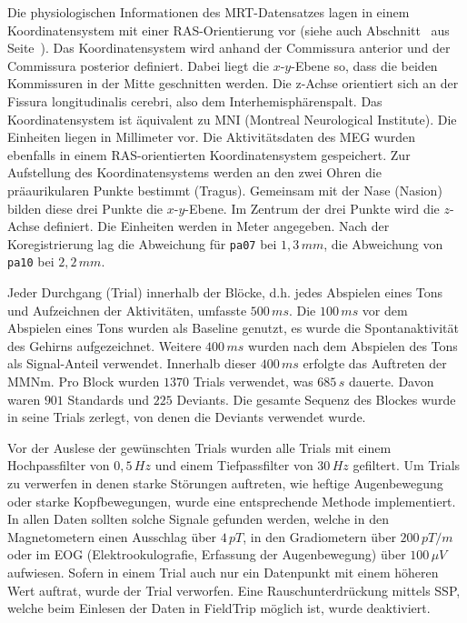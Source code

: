 \documentclass[doc,a4paper,12pt]{apa6}
\makeatletter
\DeclareRobustCommand*{\nameref}[1]{%
      \glqq{\myorg@nameref{#1}}\grqq%
    }%
\makeatother
\begin{document}
Die physiologischen Informationen des MRT-Datensatzes lagen in einem Koordinatensystem mit einer RAS-Orientierung vor (siehe auch Abschnitt~\nameref{sec:coreg} aus Seite~\pageref{sec:coreg}). Das Koordinatensystem wird anhand der Commissura anterior und der Commissura posterior definiert. Dabei liegt die $x$-$y$-Ebene so, dass die beiden Kommissuren in der Mitte geschnitten werden. Die z-Achse orientiert sich an der Fissura longitudinalis cerebri, also dem Interhemisphärenspalt. Das Koordinatensystem ist äquivalent zu MNI (Montreal Neurological Institute). Die Einheiten liegen in Millimeter vor. Die Aktivitätsdaten des MEG wurden ebenfalls in einem RAS-orientierten Koordinatensystem gespeichert. Zur Aufstellung des Koordinatensystems werden an den zwei Ohren die präaurikularen Punkte bestimmt (Tragus). Gemeinsam mit der Nase (Nasion) bilden diese drei Punkte die $x$-$y$-Ebene. Im Zentrum der drei Punkte wird die $z$-Achse definiert. Die Einheiten werden in Meter angegeben. Nach der Koregistrierung lag die Abweichung für \texttt{pa07} bei $1,3\,mm$, die Abweichung von \texttt{pa10} bei $2,2\,mm$.

Jeder Durchgang (Trial) innerhalb der Blöcke, d.h. jedes Abspielen eines Tons und Aufzeichnen der Aktivitäten, umfasste $500\,ms$. Die $100\,ms$ vor dem Abspielen eines Tons wurden als Baseline genutzt, es wurde die Spontanaktivität des Gehirns aufgezeichnet. Weitere $400\,ms$ wurden nach dem Abspielen des Tons als Signal-Anteil verwendet. Innerhalb dieser $400\,ms$ erfolgte das Auftreten der MMNm. Pro Block wurden $1370$ Trials verwendet, was $685\,s$ dauerte. Davon waren $901$ Standards und $225$ Deviants. Die gesamte Sequenz des Blockes wurde in seine Trials zerlegt, von denen die Deviants verwendet wurde.

Vor der Auslese der gewünschten Trials wurden alle Trials mit einem Hochpassfilter von $0,5\,Hz$ und einem Tiefpassfilter von $30\,Hz$ gefiltert. Um Trials zu verwerfen in denen starke Störungen auftreten, wie heftige Augenbewegung oder starke Kopfbewegungen, wurde eine entsprechende Methode implementiert. In allen Daten sollten solche Signale gefunden werden, welche in den Magnetometern einen Ausschlag über $4\,pT$, in den Gradiometern über $200\,pT/m$ oder im EOG (Elektrookulografie, Erfassung der Augenbewegung) über $100\,\mu V$ aufwiesen. Sofern in einem Trial auch nur ein Datenpunkt mit einem höheren Wert auftrat, wurde der Trial verworfen. Eine Rauschunterdrückung mittels SSP, welche beim Einlesen der Daten in FieldTrip möglich ist, wurde deaktiviert.
\end{document}

